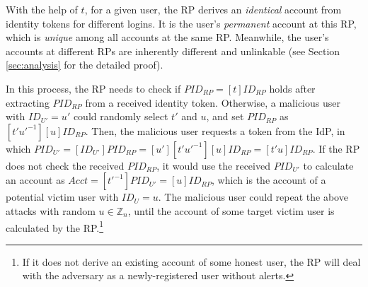 %
%

With the help of $t$, for a given user, the RP derives an \emph{identical} account from identity tokens for different logins. It is the user's \emph{permanent} account at this RP, which is \emph{unique} among all accounts at the same RP. Meanwhile, the user's accounts at different RPs are inherently different and unlinkable (see Section \ref{sec:analysis} for the detailed proof).

\newc
In this process, the RP needs to check if $PID_{RP} = [t]ID_{RP}$ holds after extracting $PID_{RP}$ from a received identity token. Otherwise, a malicious user with $ID_{U'} = u'$ could randomly select $t'$ and $u$, and set $PID_{RP}$ as $[t'u'^{-1}][u]ID_{RP}$. Then, the malicious user requests a token from the IdP, in which $PID_{U'} = [ID_{U'}]PID_{RP}=[u'][t'u'^{-1}][u]ID_{RP} = [t'u]ID_{RP}$.
If the RP does not check the received $PID_{RP}$, it would use the received $PID_{U'}$ to calculate an account as $Acct = [t'^{-1}]PID_{U'}=[u]ID_{RP}$, which is the account of a potential victim user with $ID_{U} = u$.
The malicious user could repeat the above attacks with random $u \in \mathbb{Z}_n$,
     until the account of some target victim user is calculated by the RP.\footnote{\newc If it does not derive an existing account of some honest user,
      the RP will deal with the adversary as a newly-registered user without alerts.}

